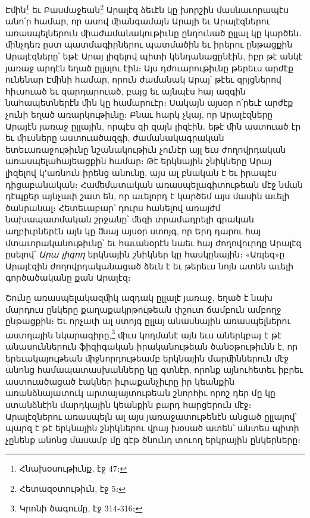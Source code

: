 \documentclass{article}
\begin{document}
{Էﬕն\footnote{Հնախօսութիւնք, էջ 47։} եւ Բասմաջեան\footnote{Հետազօտութիւն, էջ 5։} Արալէզ ձեւէն կը խորշին մասնաւորապէս անո՛ր համար, որ ասով ﬕանգամայն Արայի եւ Արալէզներու առասպելներուն ﬕաժամանակութիւնը ընդունած ըլլալ կը կարծեն․ ﬕնչդեռ ըստ պատմագիրներու պատմածին եւ իրերու ընթացքին Արալէզները՝ եթէ Արայ լիզելով պիտի կենդանացընէին, իբր թէ անկէ յառաջ արդէն եղած ըլլսլու էին։ Այս դժուարութիւնը թերեւս արժէք ունենար Էﬕնի համար, որուն ժամանակ Արայ՝ թէեւ զրյցներով հիւսուած եւ զարդարուած, բայց եւ այնպէս հայ ազգին նահապետներէն ﬕն կը համարուէր։ Սակայն այսօր ո՛րեւէ արժէք չունի եղած առարկութիւնը։ Բնաւ հարկ չկայ, որ Արալէզները Արայէն յառաջ ըլլային, որպէս զի զայն լիզէին․ եթէ ﬕն աստուած էր եւ ﬕւսները աստուածազգի, ժամանակագրական ետեւառաջութիւնը նշանակութիւն չունէր այլ եւս ժողովրդական առասպելահայեացքին համար։ Թէ երկնային շնիկները Արայ լիզելով կ՚առնուն իրենց անունը, այս ալ բնական է եւ իրապէս դիցաբանական։ Հաﬔմատական առասպելագիտութեան մէջ նման դէպքեր այնչափ շատ են, որ աւելորդ է կարծեմ այս մասին աւելի ծանրանալ։ Հետեւաբար՝ դուրս հանելով առայժմ նախապատմական շրջանը՝ ﬔզի տրամադրելի գրական աղբիւրներէն այն կը ﬓայ այսօր ստոյգ, որ Երդ դարու հայ մտաւորականութիւնը՝ եւ հաւանօրէն նաեւ հայ ժողովուրդը Արալէզ ըսելով՝ \emph{Արա լիզող} երկնային շնիկներ կը հասկընային։ «Առլեզ»ը Արալէզին ժողովրդականացած ձեւն է եւ թերեւս նոյն ատեն աւելի գործածականը քան Արալէզ։

Շունը առասպելակազﬕկ ազդակ ըլլալէ յառաջ, եղած է նախ մարդուս ընկերը քաղաքակրթութեան փշուտ ճամբուն ամբողջ ընթացքին։ Եւ որչափ ալ ստոյգ ըլլայ անասնային առասպելներու աստղային նկարագիրը,\footnote{Կրոնի ծագումը, էջ 314֊316։} ﬕւս կողմանէ այն եւս աներկբայ է թէ անասուններուն ֆիզիգական իրականութեան ծանօթութիւնն է, որ երեւակայութեան ﬕջնորդութեամբ երկնային մարﬕններուն մէջ անոնց համապատասխանները կը գտնէր, որոնք այնուհետեւ իբրեւ աստուածացած էակներ իւրաքանչիւրը իր կեանքին առանձնայատուկ արտայայտութեան շնորհիւ որոշ դեր մը կը ստանձնէին մարդկային կեանքին բարդ հարցերուն մէջ։ Արալէզներու առասպելն ալ այս յառաջատութենէն անցած ըլլալով՝ պարզ է թէ երկնային շնիկներու վրայ խօսած ատեն՝ անտես պիտի չընենք անոնց մասամբ մը գէթ ծնունդ տուող երկրային ընկերները։

}
\end{document}
